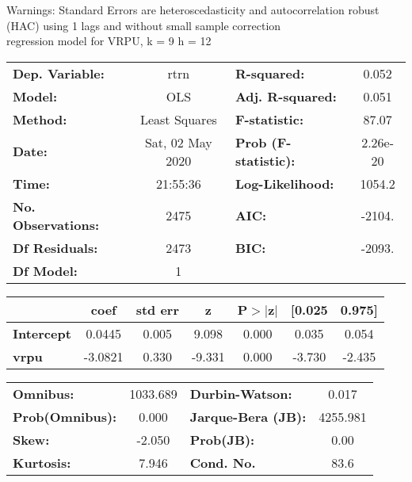 Warnings: \newline
 [1] Standard Errors are heteroscedasticity and autocorrelation robust (HAC) using 1 lags and without small sample correction\\ 

regression model for VRPU, k = 9 h = 12\begin{center}
\begin{tabular}{lclc}
\toprule
\textbf{Dep. Variable:}    &       rtrn       & \textbf{  R-squared:         } &     0.052   \\
\textbf{Model:}            &       OLS        & \textbf{  Adj. R-squared:    } &     0.051   \\
\textbf{Method:}           &  Least Squares   & \textbf{  F-statistic:       } &     87.07   \\
\textbf{Date:}             & Sat, 02 May 2020 & \textbf{  Prob (F-statistic):} &  2.26e-20   \\
\textbf{Time:}             &     21:55:36     & \textbf{  Log-Likelihood:    } &    1054.2   \\
\textbf{No. Observations:} &        2475      & \textbf{  AIC:               } &    -2104.   \\
\textbf{Df Residuals:}     &        2473      & \textbf{  BIC:               } &    -2093.   \\
\textbf{Df Model:}         &           1      & \textbf{                     } &             \\
\bottomrule
\end{tabular}
\begin{tabular}{lcccccc}
                   & \textbf{coef} & \textbf{std err} & \textbf{z} & \textbf{P$> |$z$|$} & \textbf{[0.025} & \textbf{0.975]}  \\
\midrule
\textbf{Intercept} &       0.0445  &        0.005     &     9.098  &         0.000        &        0.035    &        0.054     \\
\textbf{vrpu}      &      -3.0821  &        0.330     &    -9.331  &         0.000        &       -3.730    &       -2.435     \\
\bottomrule
\end{tabular}
\begin{tabular}{lclc}
\textbf{Omnibus:}       & 1033.689 & \textbf{  Durbin-Watson:     } &    0.017  \\
\textbf{Prob(Omnibus):} &   0.000  & \textbf{  Jarque-Bera (JB):  } & 4255.981  \\
\textbf{Skew:}          &  -2.050  & \textbf{  Prob(JB):          } &     0.00  \\
\textbf{Kurtosis:}      &   7.946  & \textbf{  Cond. No.          } &     83.6  \\
\bottomrule
\end{tabular}
\end{center}

